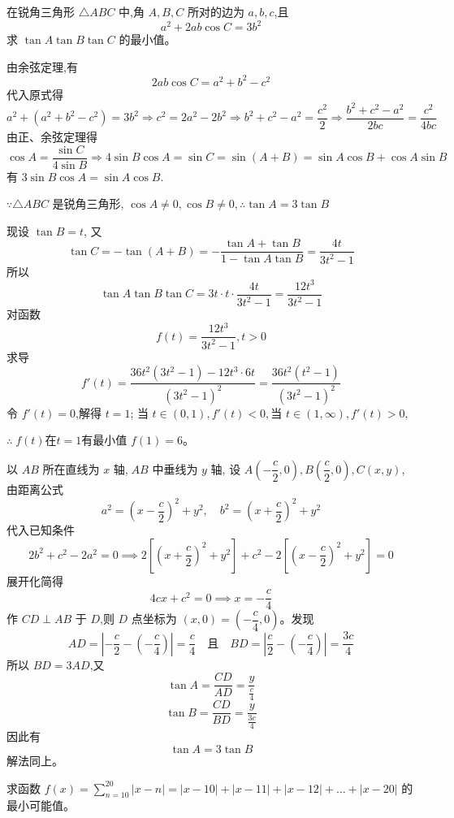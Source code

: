 \begin{questions}
    \question 在锐角三角形 $\triangle ABC$ 中,角 $A,B,C$ 所对的边为 $a,b,c$,且
        \[
        a^2 + 2ab\cos C = 3b^2
        \]
        求 $\tan A \tan B \tan C$ 的最小值。
    \begin{solution}
        由余弦定理,有
        \[
        2ab\cos C = a^2+b^2-c^2
        \]
        代入原式得
        \[
        a^2 + (a^2+b^2-c^2) = 3b^2 \Rightarrow c^2 = 2a^2 - 2b^2 \Rightarrow b^2 + c^2 - a^2 = \frac{c^2}{2} \Rightarrow \frac{b^2 + c^2 - a^2}{2bc} = \frac{c^2}{4bc}
        \]
        由正、余弦定理得
        \[
        \cos A = \frac{\sin C}{4\sin B} \Rightarrow 4\sin B \cos A  =\sin C = \sin(A+B) = \sin A \cos B + \cos A \sin B
        \]
        有 $3\sin B \cos A = \sin A \cos B$.
        
        $\because \triangle ABC$ 是锐角三角形, $\cos A\neq0,\cos B\neq0, \therefore \tan A=3\tan B $
        
        现设 $\tan B = t$, 又
        \[
        \tan C = -\tan(A+B) = -\frac{\tan A + \tan B}{1-\tan A\tan B} = \frac{4t}{3t^2-1}
        \]
        所以
        \[
        \tan A \tan B \tan C = 3t \cdot t \cdot \frac{4t}{3t^2-1} = \frac{12t^3}{3t^2-1}
        \]
        对函数
        \[
        f(t) = \frac{12t^3}{3t^2-1}, t>0
        \]
        求导
        \[
        f'(t) = \frac{36t^2(3t^2-1) - 12t^3 \cdot 6t}{(3t^2-1)^2} = \frac{36t^2(t^2-1)}{(3t^2-1)^2}
        \]
        令 $f'(t)=0$,解得 $t=1$; 当 $t\in (0,1),f'(t)<0,$当 $t\in (1,\infty),f'(t)>0,$

        $\therefore\; f(t)$在$t=1$有最小值 $f(1)=6$。
    \end{solution}
    \begin{solution}
        以 $AB$ 所在直线为 $x$ 轴,$\;AB$ 中垂线为 $y$ 轴, 设 $A(-\dfrac{c}{2},0),B(\dfrac{c}{2},0),C(x,y)$,       
        由距离公式
        \[
        a^2 = (x-\frac{c}{2})^2 + y^2, \quad b^2 = (x+\frac{c}{2})^2 + y^2
        \]
        代入已知条件
        \[
        2b^2 + c^2 - 2a^2 = 0 \implies 2\left[(x+\frac{c}{2})^2 + y^2\right] + c^2 - 2\left[(x-\frac{c}{2})^2 + y^2\right] = 0
        \]
        展开化简得
        \[
        4c x + c^2 = 0 \implies x = -\frac{c}{4}
        \]
        作 $CD \perp AB$ 于 $D$,则 $D$ 点坐标为 $(x,0) = \left(-\dfrac{c}{4},0\right)$。发现
        \[
        AD = \left|-\frac{c}{2} - \left(-\frac{c}{4}\right)\right| = \frac{c}{4} \quad \text{且} \quad BD = \left|\frac{c}{2} - \left(-\frac{c}{4}\right)\right| = \frac{3c}{4}
        \]
        所以 $BD = 3AD$,又
        \[
        \tan A = \frac{CD}{AD} = \frac{y}{\frac{c}{4}}
        \]
        \[
        \tan B = \frac{CD}{BD} = \frac{y}{\frac{3c}{4}}
        \]
        因此有
        \[
        \tan A = 3 \tan B
        \]
        解法同上。
    \end{solution}
\question 求函数 $f(x) = \sum_{n=10}^{20} |x - n| = |x - 10| + |x - 11| + |x - 12| + \dots + |x - 20|$ 的最小可能值。


\end{questions}
